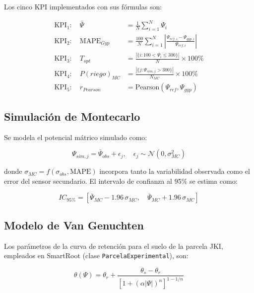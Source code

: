 \documentclass[12pt,a4paper]{article}
\begin{document}
Los cinco KPI implementados con sus fórmulas son:

\begin{align}
\text{KPI}_1: \quad \bar{\Psi} &= \frac{1}{N}\sum_{i=1}^{N} \Psi_i \label{eq:kpi1} \\[6pt]
\text{KPI}_2: \quad \text{MAPE}_{Gyp} &= \frac{100}{N}\sum_{i=1}^{N}\left|\frac{\Psi_{ref,i}-\Psi_{gyp,i}}{\Psi_{ref,i}}\right| \label{eq:kpi2} \\[6pt]
\text{KPI}_3: \quad T_{opt} &= \frac{|\{i: 100 < \Psi_i \leq 300\}|}{N} \times 100\% \label{eq:kpi3} \\[6pt]
\text{KPI}_4: \quad P(riego)_{MC} &= \frac{|\{j: \Psi_{sim,j} > 300\}|}{N_{MC}} \times 100\% \label{eq:kpi4} \\[6pt]
\text{KPI}_5: \quad r_{Pearson} &= \text{Pearson}(\Psi_{ref}, \Psi_{gyp}) \label{eq:kpi5}
\end{align}

\subsection{Simulación de Montecarlo}

Se modela el potencial mátrico simulado como:

\begin{equation}
\Psi_{sim,j} = \bar{\Psi}_{obs} + \epsilon_j, \quad \epsilon_j \sim \mathcal{N}(0, \sigma_{MC}^2)
\label{eq:montecarlo}
\end{equation}

\noindent donde $\sigma_{MC} = f(\sigma_{obs}, \text{MAPE})$ incorpora tanto la variabilidad observada como el error del sensor secundario. El intervalo de confianza al 95\% se estima como:

\begin{equation}
IC_{95\%} = \left[\bar{\Psi}_{MC} - 1.96\,\sigma_{MC},\quad \bar{\Psi}_{MC} + 1.96\,\sigma_{MC}\right]
\label{eq:ic}
\end{equation}

\subsection{Modelo de Van Genuchten}

Los parámetros de la curva de retención para el suelo de la parcela JKI, empleados en SmartRoot (clase \texttt{ParcelaExperimental}), son:

\begin{equation}
\theta(\Psi) = \theta_r + \frac{\theta_s - \theta_r}{\left[1 + (\alpha |\Psi|)^n\right]^{1-1/n}}
\label{eq:vg_implementado}
\end{equation}
\end{document}

